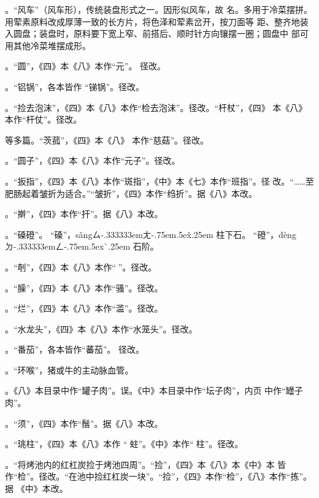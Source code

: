 。“风车”（风车形），传统装盘形式之一。因形似风车，故
名。多用于冷菜摆拼。用荤素原料改成厚薄一致的长方片，将色泽和荤素岔开，按刀面等
距、整齐地装入圆盘；装盘时，原料要下宽上窄、前搭后、顺时针方向镶摆一圈；圆盘中
部可用其他冷菜堆摆成形。

。“圆”，《四》本《八》本作“元”。
径改。

。“铝锅”，各本皆作
“锑锅”。\xeCJKnobreak{}径改。

。“捡去泡沫”，《四》本《八》本作“检去泡沫”。径改。“杆杖”，《四》
本《八》本作“杆仗”。径改。

等多篇。“茨菰”，《四》本《八》
本作“慈菇”。径改。

。“圆子”，《四》本《八》本作“元子”。径改。

。“扳指”，《四》本《八》本作“斑指”，《中》本《七》本作“班指”。径
改。“……至肥肠起着皱折为适合。”“皱折”，《四》本作“绉折”。据《八》本改。

。“擀”，《四》本作“扞”。据《八》本改。

。“磉磴”。
“磉”，{s\v{a}ng}{ㄙ\kern-.333333emㄤ\kern-.75em\raise.5ex\hbox{\v{}}\kern.25em}
柱下石。
“磴”，{d\`{e}ng}{ㄉ\kern-.333333emㄥ\kern-.75em\raise.5ex\hbox{\`{}}\kern.25em}
石阶。

。“剞”，《四》本《八》本作“𠟤”。径改。

。“臊”，《四》本《八》本作“骚”。径改。

。“烂”，《四》本《八》本作“滥”。径改。

。“水龙头”，《四》本《八》本作“水笼头”。径改。

。“番茄”，各本皆作“蕃茄”。
径改。

。“环喉”，猪或牛的主动脉血管。

。《八》本目录中作“罐子肉”。误。《中》本目录中作“坛子肉”，内页
中作“罎子肉”。

。“须”，《四》本作“鬚”。据《八》本改。

。“珧柱”，《四》本《八》本作
“𧎼蛀”。《中》本作“𧎼柱”。径改。

。“将烤池内的红杠炭捡于烤池四周”。“捡”，《四》本《八》本《中》本
皆作“检”。径改。“在池中捡红杠炭一块”。“捡”，《四》本作“检”，《八》本作“拣”。据
《中》本改。

